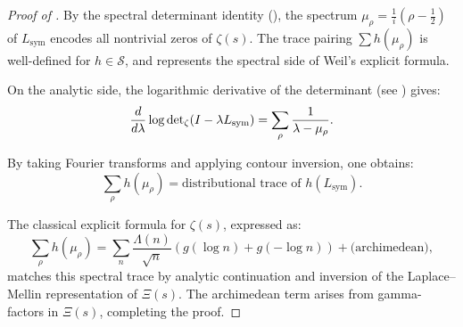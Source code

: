 \begin{proof}[Proof of ]
By the spectral determinant identity (), the spectrum \( \mu_\rho = \tfrac{1}{i}(\rho - \tfrac{1}{2}) \) of \( L_{\mathrm{sym}} \) encodes all nontrivial zeros of \( \zeta(s) \). The trace pairing \( \sum h(\mu_\rho) \) is well-defined for \( h \in \mathcal{S} \), and represents the spectral side of Weil’s explicit formula.

On the analytic side, the logarithmic derivative of the determinant (see ) gives:
\[
\frac{d}{d\lambda} \log \det\nolimits_{\zeta}(I - \lambda L_{\mathrm{sym}}) = \sum_\rho \frac{1}{\lambda - \mu_\rho}.
\]

By taking Fourier transforms and applying contour inversion, one obtains:
\[
\sum_\rho h(\mu_\rho) = \text{distributional trace of } h(L_{\mathrm{sym}}).
\]

The classical explicit formula for \( \zeta(s) \), expressed as:
\[
\sum_\rho h(\mu_\rho) = \sum_n \frac{\Lambda(n)}{\sqrt{n}} (g(\log n) + g(-\log n)) + \text{(archimedean)},
\]
matches this spectral trace by analytic continuation and inversion of the Laplace–Mellin representation of \( \Xi(s) \). The archimedean term arises from gamma-factors in \( \Xi(s) \), completing the proof.
\end{proof}

